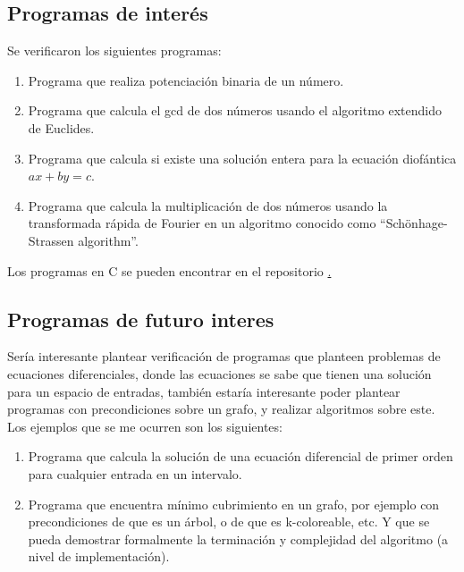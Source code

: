 \documentclass{hw-template}
\begin{document}
\subsection{Programas de interés}
Se verificaron los siguientes programas:
\begin{enumerate}
    \item Programa que realiza potenciación binaria de un número.
    \item Programa que calcula el gcd de dos números usando el algoritmo
    extendido de Euclides.
    \item Programa que calcula si existe una solución entera para la ecuación
    diofántica $ax + by = c$.
    \item Programa que calcula la multiplicación de dos números usando la transformada
    rápida de Fourier en un algoritmo conocido como ``Schönhage-Strassen algorithm''.
\end{enumerate}

Los programas en C se pueden encontrar en el repositorio \href{https://github.com/KurtCoVayne/cm0081-2023-2-lab3/tree/main/src}.

\subsection{Programas de futuro interes}
Sería interesante plantear verificación de programas que planteen problemas
de ecuaciones diferenciales, donde las ecuaciones se sabe que tienen una solución
para un espacio de entradas, también estaría interesante poder plantear programas
con precondiciones sobre un grafo, y realizar algoritmos sobre este. Los ejemplos
que se me ocurren son los siguientes:

\begin{enumerate}
    \item Programa que calcula la solución de una ecuación diferencial de primer
    orden para cualquier entrada en un intervalo.
    \item Programa que encuentra mínimo cubrimiento en un grafo, por ejemplo con
    precondiciones de que es un árbol, o de que es k-coloreable, etc. Y que se pueda
    demostrar formalmente la terminación y complejidad del algoritmo (a nivel de implementación).
\end{enumerate}


\printbibliography
\end{document}
